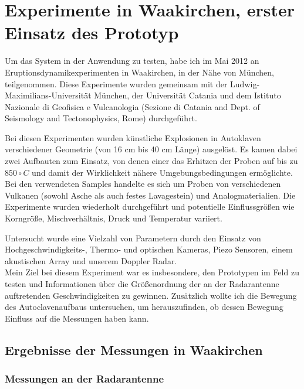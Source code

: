 \documentclass[12pt,a4paper,twoside,BCOR=12.5mm]{scrartcl}
\begin{document}
\section{Experimente in Waakirchen, erster Einsatz des Prototyp}

Um das System in der Anwendung zu testen, habe ich im Mai 2012 an Eruptionsdynamikexperimenten in Waakirchen, in der Nähe von München, teilgenommen. Diese Experimente wurden gemeinsam mit der Ludwig-Maximilians-Universität München, der Universität Catania und dem Istituto Nazionale di Geofisica e Vulcanologia (Sezione di Catania and Dept. of Seismology and Tectonophysics, Rome) durchgeführt. 

Bei diesen Experimenten wurden künstliche Explosionen in Autoklaven \citep{Spieler:2004fk} verschiedener Geometrie (von 16 cm bis 40 cm Länge) ausgelöst. Es kamen dabei zwei Aufbauten zum Einsatz, von denen einer das Erhitzen der Proben auf bis zu $850\circ C$ und damit der Wirklichkeit nähere Umgebungsbedingungen ermöglichte. Bei den verwendeten Samples handelte es sich um Proben von verschiedenen Vulkanen (sowohl Asche als auch festes Lavagestein) und Analogmaterialien.
Die Experimente wurden wiederholt durchgeführt und potentielle Einflussgrößen wie Korngröße, Mischverhältnis, Druck und Temperatur variiert.

Untersucht wurde eine Vielzahl von Parametern durch den Einsatz von Hoch\-ge\-schwindig\-keits-, Thermo- und optischen Kameras, Piezo Sensoren, einem akustischen Array und unserem Doppler Radar.\\

Mein Ziel bei diesem Experiment war es insbesondere, den Prototypen im Feld zu testen und Informationen über die Größenordnung der an der Radarantenne auftretenden Geschwindigkeiten zu gewinnen. Zusätzlich wollte ich die Bewegung des Autoclavenaufbaus untersuchen, um herauszufinden, ob dessen Bewegung Einfluss auf die Messungen haben kann.



\subsection{Ergebnisse der Messungen in Waakirchen}



\subsubsection{Messungen an der Radarantenne}
\end{document}
